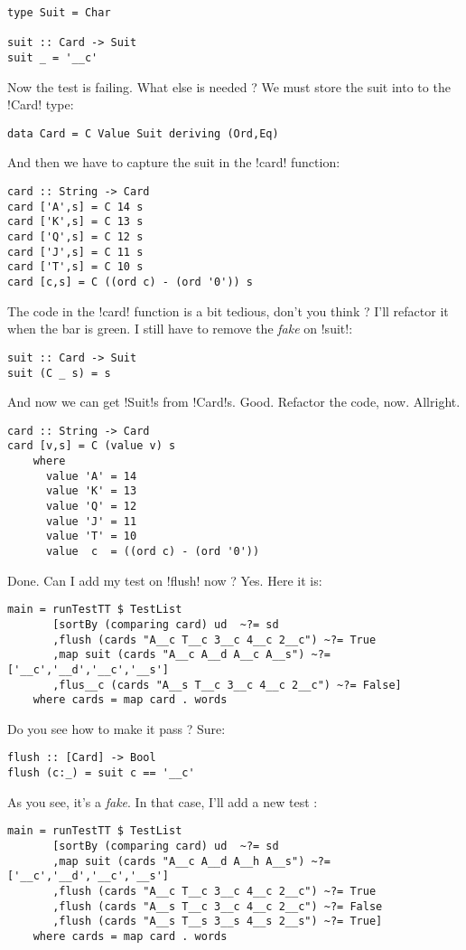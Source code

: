 \begin{lstlisting}[frame=single]
type Suit = Char

suit :: Card -> Suit
suit _ = '__c'
\end{lstlisting}
\failure Now the test is failing.
\lhN What else is needed ?
\lhA \failure We must store the suit into to the \il!Card! type:
\begin{lstlisting}[frame=single]
data Card = C Value Suit deriving (Ord,Eq)
\end{lstlisting}
And then we have to capture the suit in the \il!card! function:
\begin{lstlisting}[frame=single]
card :: String -> Card
card ['A',s] = C 14 s
card ['K',s] = C 13 s
card ['Q',s] = C 12 s
card ['J',s] = C 11 s
card ['T',s] = C 10 s
card [c,s] = C ((ord c) - (ord '0')) s
\end{lstlisting}
\lhN \failure The code in the \il!card! function is a bit tedious, don't you think ?
\lhA \failure I'll refactor it when the bar is green. I still have to remove the \emph{fake} on \il!suit!:
\begin{lstlisting}[frame=single]
suit :: Card -> Suit
suit (C _ s) = s
\end{lstlisting}
\success And now we can get \il!Suit!s from \il!Card!s.
\lhN Good. Refactor the code, now.
\lhA \success Allright.
\begin{lstlisting}[frame=single]
card :: String -> Card
card [v,s] = C (value v) s
    where 
      value 'A' = 14
      value 'K' = 13
      value 'Q' = 12
      value 'J' = 11
      value 'T' = 10
      value  c  = ((ord c) - (ord '0'))
\end{lstlisting}
\success Done.
\lhN Can I add my test on \il!flush! now ?
\lhA Yes.
\lhN Here it is:
\begin{lstlisting}[frame=single]
main = runTestTT $ TestList 
       [sortBy (comparing card) ud  ~?= sd
       ,flush (cards "A__c T__c 3__c 4__c 2__c") ~?= True
       ,map suit (cards "A__c A__d A__c A__s") ~?= ['__c','__d','__c','__s']
       ,flus__c (cards "A__s T__c 3__c 4__c 2__c") ~?= False]
    where cards = map card . words
\end{lstlisting} %
Do you see how to make it pass ?
\lhA \failure Sure: 
\begin{lstlisting}[frame=single]
flush :: [Card] -> Bool
flush (c:_) = suit c == '__c'
\end{lstlisting}
\success As you see, it's a \emph{fake}.
\lhN In that case, I'll add a new test :
\begin{lstlisting}[frame=single]
main = runTestTT $ TestList 
       [sortBy (comparing card) ud  ~?= sd
       ,map suit (cards "A__c A__d A__h A__s") ~?= ['__c','__d','__c','__s']
       ,flush (cards "A__c T__c 3__c 4__c 2__c") ~?= True
       ,flush (cards "A__s T__c 3__c 4__c 2__c") ~?= False
       ,flush (cards "A__s T__s 3__s 4__s 2__s") ~?= True]
    where cards = map card . words
\end{lstlisting} %
